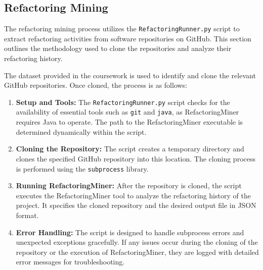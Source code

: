\documentclass[sigconf]{acmart}
\begin{document}
\subsection{Refactoring Mining}
The refactoring mining process utilizes the \texttt{RefactoringRunner.py} script to extract refactoring activities from software repositories on GitHub. This section outlines the methodology used to clone the repositories and analyze their refactoring history.

The dataset provided in the coursework is used to identify and clone the relevant GitHub repositories. Once cloned, the process is as follows:

\begin{enumerate}
    \item \textbf{Setup and Tools:} The \texttt{RefactoringRunner.py} script checks for the availability of essential tools such as \texttt{git} and \texttt{java}, as RefactoringMiner requires Java to operate. The path to the RefactoringMiner executable is determined dynamically within the script.

    \item \textbf{Cloning the Repository:} The script creates a temporary directory and clones the specified GitHub repository into this location. The cloning process is performed using the \texttt{subprocess} library.

    \item \textbf{Running RefactoringMiner:} After the repository is cloned, the script executes the RefactoringMiner tool to analyze the refactoring history of the project. It specifies the cloned repository and the desired output file in JSON format. 

    \item \textbf{Error Handling:} The script is designed to handle subprocess errors and unexpected exceptions gracefully. If any issues occur during the cloning of the repository or the execution of RefactoringMiner, they are logged with detailed error messages for troubleshooting.


\end{enumerate}
\end{document}
